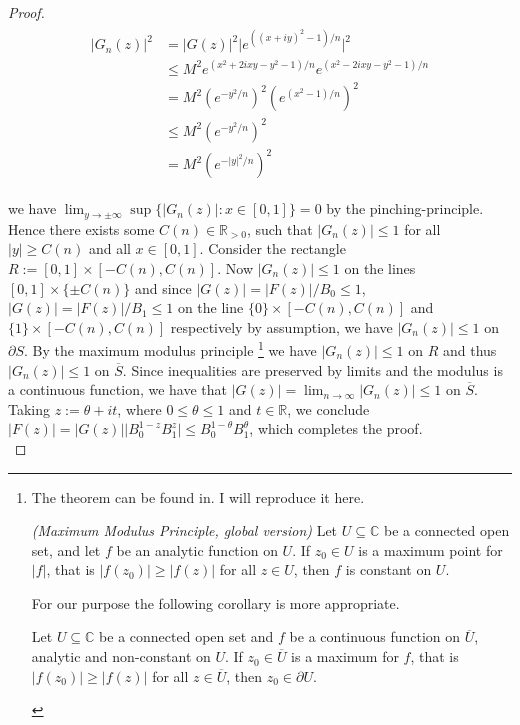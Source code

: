 \begin{proof}
					\begin{gather}
						\begin{aligned}
						\vert G_n(z)\vert^2 &= \vert G(z) \vert^2 \vert e^{((x + iy)^2 - 1)/n} \vert^2\\
						& \leqslant M^2 e^{(x^2 + 2ixy -y^2 - 1)/n} e^{(x^2 - 2ixy -y^2 - 1)/n}\\
						&= M^2 \left( e^{-y^2/n} \right)^2 \left(e^{(x^2 - 1)/n}\right)^2\\
						&\leqslant M^2 \left(e^{-y^2/n}\right)^2\\
						&= M^2 \left( e^{-\vert y \vert^2/n} \right)^2
						\end{aligned}
					\end{gather}

					we have $\lim_{y \rightarrow \pm \infty}\sup\{\vert G_n(z)\vert : x \in [0,1]\} = 0$ by the pinching-principle. Hence there exists some $C(n) \in \mathbb{R}_{>0}$, such that $\vert G_n(z) \vert \leqslant 1$ for all $\vert y \vert \geqslant C(n)$ and all $x \in [0,1]$. Consider the rectangle $R := [0,1] \times [-C(n),C(n)]$. Now $\vert G_n(z) \vert \leqslant 1$ on the lines $[0,1] \times \{\pm C(n)\}$ and since $\vert G(z) \vert = \vert F(z)\vert/B_0 \leqslant 1$, $\vert G(z) \vert = \vert F(z) \vert/B_1 \leqslant 1$ on the line $\{0\} \times [-C(n),C(n)]$ and $\{1\} \times [-C(n),C(n)]$ respectively by assumption, we have $\vert G_n(z) \vert \leqslant 1$ on $\partial S$. By the maximum modulus principle \footnote{
						The theorem can be found in\cite[91--92]{lang:complex_analysis:1993}. I will reproduce it here.

						\begin{lemma}\emph{(Maximum Modulus Principle, global version)}
							Let $U \subseteq \mathbb{C}$ be a connected open set, and let $f$ be an analytic function on $U$. If $z_0 \in U$ is a maximum point for $\vert f \vert$, that is $\vert f(z_0) \vert \geqslant \vert f(z) \vert$ for all $z \in U$, then $f$ is constant on $U$.
						\end{lemma}

						For our purpose the following corollary is more appropriate.

						\begin{corollary}
							Let $U \subseteq \mathbb{C}$ be a connected open set and $f$ be a continuous function on $\overline{U}$, analytic and non-constant on $U$. If $z_0 \in \overline{U}$ is a maximum for $f$, that is $\vert f(z_0) \vert \geqslant \vert f(z) \vert$ for all $z \in \overline{U}$, then $z_0 \in \partial U$.
						\end{corollary}
					}
					we have $\vert G_n(z) \vert \leqslant 1$ on $R$ and thus $\vert G_n(z) \vert \leqslant 1$ on $\overline{S}$. Since inequalities are preserved by limits and the modulus is a continuous function, we have that $\vert G(z) \vert = \lim_{n \rightarrow \infty} \vert G_n(z) \vert \leqslant 1$ on $\overline{S}$. Taking $z := \theta + it$, where $0 \leqslant \theta \leqslant 1$ and $t \in \mathbb{R}$, we conclude $\vert F(z) \vert = \vert G(z) \vert \vert B_0^{1 - z}B_1^z\vert \leqslant B_0^{1 - \theta} B_1^{\theta}$, which completes the proof.\\
					

\end{proof}
